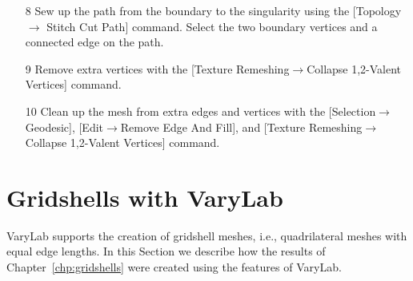 \documentclass[Thesis.tex]{subfiles}
\begin{document}
\begin{itemize}
\item[8] Sew up the path from the boundary to the singularity using the [Topology$\to$ Stitch Cut Path] command. Select the two boundary vertices and a connected edge on the path.
\item[9] Remove extra vertices with the [Texture Remeshing$\to$Collapse 1,2-Valent Vertices] command.
\item[10] Clean up the mesh from extra edges and vertices with the [Selection$\to$Geodesic], [Edit$\to$Remove Edge And Fill], and [Texture Remeshing$\to$Collapse 1,2-Valent Vertices] command.

\begin{center}
\begin{minipage}{0.9\linewidth}
            \centering
\end{minipage}
\end{center}    
            
\end{itemize}

\section{Gridshells with {\sc VaryLab}}
\label{sec:gridshells_varylab}

{\sc VaryLab} supports the creation of gridshell meshes, i.e., quadrilateral meshes with equal edge lengths. In this Section we describe how the results of Chapter~\ref{chp:gridshells} were created using the features of {\sc VaryLab}.
\end{document}
